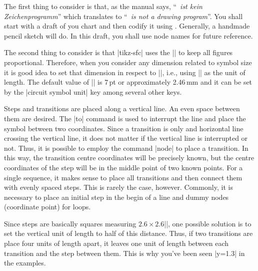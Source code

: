 \documentclass[a4paper]{ltxdoc}
\begin{document}
The first thing to consider is that, as the manual says, ``\tikzname\ \emph{ist kein Zeichenprogramm}'' which translates to ``\tikzname\ \emph{is not a drawing program}''. You shall start with a draft of you chart and then codify it using \tikzname. Generally, a handmade pencil sketch will do. In this draft, you shall use node names for future reference.

The second thing to consider is that |tikz-sfc| uses the |\tikzcircuitssizeunit| to keep all figures proportional. Therefore, when you consider any dimension related to symbol size it is good idea to set that dimension in respect to |\tikzcircuitssizeunit|, i.e., using |\tikzcircuitssizeunit| as the unit of length. The default value of |\tikzcircuitssizeunit| is 7\,pt or approximately 2.46\,mm and it can be set by the |circuit symbol unit| key among several other keys.

Steps and transitions are placed along a vertical line. An even space between them are desired. The |to| command is used to interrupt the line and place the symbol between two coordinates. Since a transition is only and horizontal line crossing the vertical line, it does not matter if the vertical line is interrupted or not. Thus, it is possible to employ the command |node| to place a transition. In this way, the transition centre coordinates will be precisely known, but the centre coordinates of the step will be in the middle point of two known points. For a single sequence, it makes sense to place all transitions and then connect them with evenly spaced steps. This is rarely the case, however. Commonly, it is necessary to place an initial step in the begin of a line and dummy nodes (coordinate point) for loops.

Since steps are basically squares measuring $2.6\times 2.6$|\tikzcircuitssizeunit|, one possible solution is to set the vertical unit of length to half of this distance. Thus, if two transitions are place four units of length apart, it leaves one unit of length between each transition and the step between them. This is why you've been seen |y=1.3\tikzcircuitssizeunit| in the examples.
\end{document}
